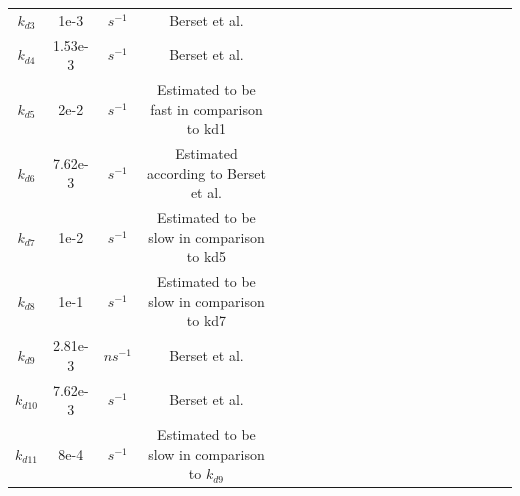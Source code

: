 \begin{table}[htbp]
\begin{tabular}{ccccccccccccccccccccc}
		$k_{d3}$&1e-3&$s^{-1} $ & Berset et al.\\
		$k_{d4}$&1.53e-3&$s^{-1} $  & Berset et al.\\
		$k_{d5} $& 2e-2&$s^{-1} $& Estimated to be fast in comparison to kd1\\
		$k_{d6}$&7.62e-3&$s^{-1} $&  Estimated according to 	
		Berset et al.\\
		$k_{d7}$& 1e-2&$s^{-1} $&  Estimated to be slow in comparison to kd5\\
		$k_{d8}$&1e-1&$s^{-1} $&  Estimated to be slow in comparison to kd7\\
		$k_{d9}$&2.81e-3  & $ns^{-1}$ & Berset et al.  \\
		$k_{d10} $ &7.62e-3 &$s^{-1}$ & Berset et al. \\
		$k_{d11}$& 8e-4& $s^{-1}$& Estimated to be slow in comparison to $k_{d9}$ \\
		\bottomrule
	\end{tabular}
\end{table}
